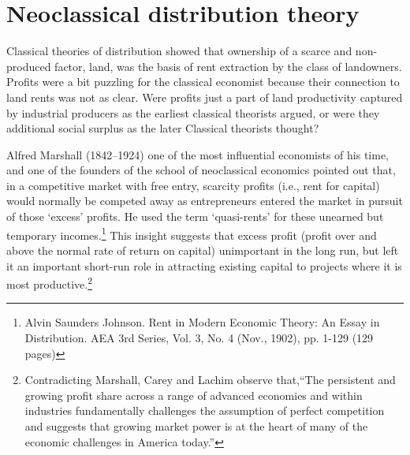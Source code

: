 



\section{Neoclassical distribution theory}

Classical theories of distribution showed that ownership of a scarce and non-produced factor, land, was the  basis of rent extraction by the class of landowners. Profits were a bit puzzling for the classical economist because their connection to land rents was not as clear. Were profits just a part of land productivity captured by industrial producers as the earliest classical theorists argued, or were they  additional social surplus as the later Classical theorists thought? %

Alfred Marshall (1842--1924)  one of the most influential economists of his time, and one of the founders of the school of neoclassical economics pointed out that, in a competitive market with free entry, scarcity profits (i.e., rent for capital) would normally be competed away  as entrepreneurs entered the market in pursuit of those `excess' profits. He used the term `quasi-rents' for these unearned but temporary incomes.\footnote{Alvin Saunders Johnson. Rent in Modern Economic Theory: An Essay in Distribution. AEA 3rd Series, Vol. 3, No. 4 (Nov., 1902), pp. 1-129 (129 pages)} This insight suggests that excess profit (profit over and above the normal rate of return on capital) unimportant in the long run, but left it an important short-run role in attracting existing capital to projects where it is most productive.\footnote{Contradicting Marshall, Carey and Lachim \cite{careySomethingNothingHow2019} observe that,``The persistent and growing profit share across a range of advanced economies and within industries fundamentally challenges the assumption of perfect competition and suggests that growing market power is at the heart of many of the economic challenges in America today.''} 


